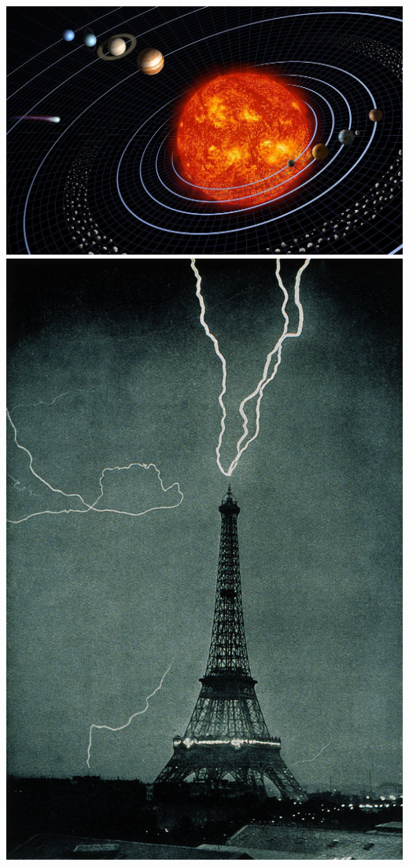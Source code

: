 \marginpar
{
	\includegraphics[width=\marginparwidth]{SM/solaire.jpg}
	\includegraphics[width=\marginparwidth]{SM/foudre.jpg}
}
